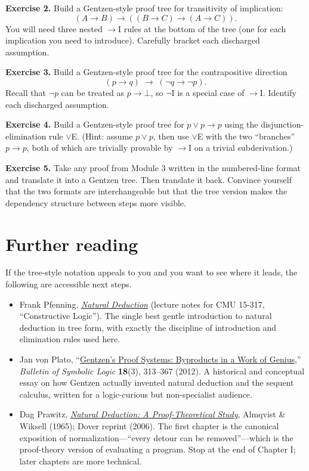 \documentclass[11pt]{article}
\begin{document}
\bigskip
\textbf{Exercise 2.}\label{ex:gentzen:2} Build a Gentzen-style proof tree for transitivity of implication:
\[
  (A \to B) \to ((B \to C) \to (A \to C)).
\]
You will need three nested $\to$I rules at the bottom of the tree (one for each implication you need to introduce). Carefully bracket each discharged assumption.

\bigskip
\textbf{Exercise 3.}\label{ex:gentzen:3} Build a Gentzen-style proof tree for the contrapositive direction
\[
  (p \to q) \;\to\; (\lnot q \to \lnot p).
\]
Recall that $\lnot p$ can be treated as $p \to \bot$, so $\lnot$I is a special case of $\to$I. Identify each discharged assumption.

\bigskip
\textbf{Exercise 4.}\label{ex:gentzen:4} Build a Gentzen-style proof tree for $p \vee p \to p$ using the disjunction-elimination rule $\vee$E. (Hint: assume $p \vee p$, then use $\vee$E with the two ``branches'' $p \to p$, both of which are trivially provable by $\to$I on a trivial subderivation.)

\bigskip
\textbf{Exercise 5.}\label{ex:gentzen:5} Take any proof from Module 3 written in the numbered-line format and translate it into a Gentzen tree. Then translate it back. Convince yourself that the two formats are interchangeable but that the tree version makes the dependency structure between steps more visible.

\section*{Further reading}

If the tree-style notation appeals to you and you want to see where it leads, the following are accessible next steps.

\begin{itemize}
  \item Frank Pfenning, \href{https://www.cs.cmu.edu/~fp/courses/15317-s23/lectures/02-natded.pdf}{\emph{Natural Deduction}} (lecture notes for CMU 15-317, ``Constructive Logic''). The single best gentle introduction to natural deduction in tree form, with exactly the discipline of introduction and elimination rules used here.
  \item Jan von Plato, ``\href{https://projecteuclid.org/journals/bulletin-of-symbolic-logic/volume-18/issue-3/Gentzens-proof-systems-byproducts-in-a-work-of-genius/10.2178/bsl/1344861886.short}{Gentzen's Proof Systems: Byproducts in a Work of Genius},'' \emph{Bulletin of Symbolic Logic} \textbf{18}(3), 313--367 (2012). A historical and conceptual essay on how Gentzen actually invented natural deduction and the sequent calculus, written for a logic-curious but non-specialist audience.
  \item Dag Prawitz, \emph{\href{https://store.doverpublications.com/0486446557.html}{Natural Deduction: A Proof-Theoretical Study}}, Almqvist \& Wiksell (1965); Dover reprint (2006). The first chapter is the canonical exposition of normalization---``every detour can be removed''---which is the proof-theory version of evaluating a program. Stop at the end of Chapter I; later chapters are more technical.
\end{itemize}
\end{document}

